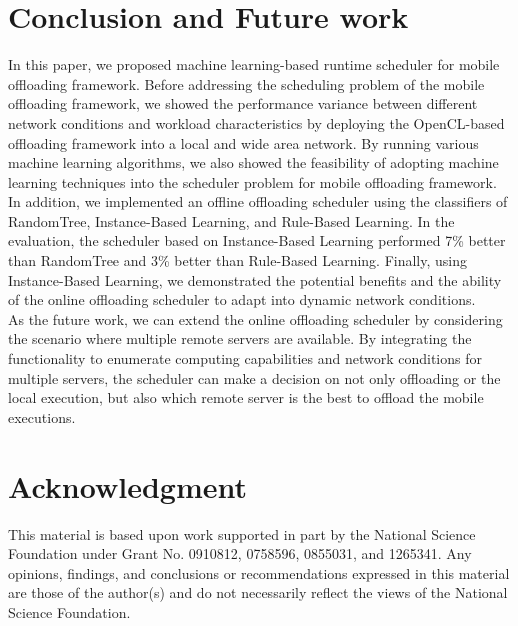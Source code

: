 \documentclass[10pt, conference, compsocconf]{IEEEtran}
\begin{document}
\section{Conclusion and Future work}
In this paper, we proposed machine learning-based runtime scheduler for
mobile offloading framework.
%
Before addressing the scheduling problem of the mobile offloading
framework, we showed the performance variance between different network
conditions and workload characteristics by deploying the OpenCL-based
offloading framework into a local and wide area network.   
%
By running various machine learning algorithms, we also showed the
feasibility of adopting machine learning techniques into the scheduler
problem for mobile offloading framework.
%
In addition, we implemented an offline offloading scheduler
using the classifiers of RandomTree, Instance-Based Learning, 
and Rule-Based Learning.
%
In the evaluation, the scheduler based on Instance-Based Learning
performed 7\% better than RandomTree and 3\% better than Rule-Based
Learning.
%
Finally, using Instance-Based Learning, we demonstrated the potential 
benefits and the ability of the online offloading scheduler to adapt
into dynamic network conditions.\\
%
\indent As the future work, we can extend the online offloading
scheduler by considering the scenario where multiple remote servers are
available.
%
By integrating the functionality to enumerate computing capabilities and
network conditions for multiple servers, the scheduler can make a decision
on not only offloading or the local execution, but also which remote
server is the best to offload the mobile executions.
% 
\section*{Acknowledgment}
This material is based upon work supported in part by the National Science
Foundation under Grant No. 0910812, 0758596, 0855031, and 1265341.
%
Any opinions, findings, and conclusions or recommendations expressed in
this material are those of the author(s) and do not necessarily reflect
the views of the National Science Foundation.
%





\end{document}
